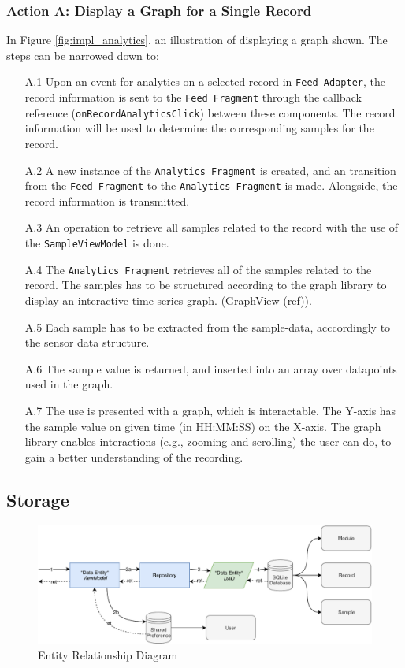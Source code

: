 \subsubsection{Action A: Display a Graph for a Single Record}
In Figure \ref{fig:impl_analytics}, an illustration of displaying a graph shown. The steps can be narrowed down to:

\begin{itemize}
    \item[A.1] Upon an event for analytics on a selected record in \verb|Feed Adapter|, the record information is sent to the \verb|Feed Fragment| through the callback reference (\verb|onRecordAnalyticsClick|) between these components. The record information will be used to determine the corresponding samples for the record.
    \item[A.2] A new instance of the \verb|Analytics Fragment| is created, and an transition from the \verb|Feed Fragment| to the \verb|Analytics Fragment| is made. Alongside, the record information is transmitted.
    \item[A.3] An operation to retrieve all samples related to the record with the use of the \verb|SampleViewModel| is done. 
    \item[A.4] The \verb|Analytics Fragment| retrieves all of the samples related to the record. The samples has to be structured according to the graph library to display an interactive time-series graph. (GraphView (ref)).
    \item[A.5] Each sample has to be extracted from the sample-data, acccordingly to the sensor data structure.
    \item[A.6] The sample value is returned, and inserted into an array over datapoints used in the graph. 
    \item[A.7] The use is presented with a graph, which is interactable. The Y-axis has the sample value on given time (in HH:MM:SS) on the X-axis. The graph library enables interactions (e.g., zooming and scrolling) the user can do, to gain a better understanding of the recording. 
\end{itemize}



\subsection{Storage}
\begin{figure}
    \centering
    \includegraphics[scale=0.60]{images/Storage_Imp.pdf}
    \caption{Entity Relationship Diagram}
    \label{fig:impl_storage}
\end{figure}


